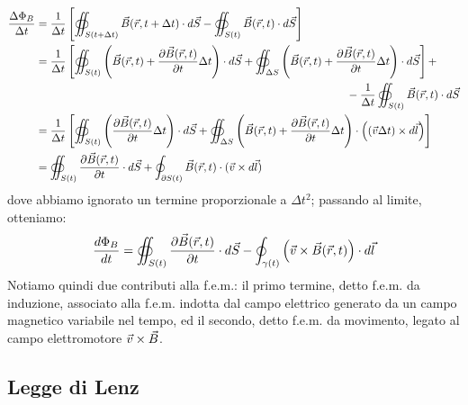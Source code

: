 \begin{equation}
	\begin{split}
		\frac{\Delta\Phi_B}{\Delta t} &= \frac{1}{\Delta t} \left[ \oiint_{S(t+\Delta t)} \vec{B}(\vec{r},t+\Delta t) \cdot d\vec{S} - \oiint_{S(t)} \vec{B}(\vec{r},t)\cdot d\vec{S} \right] \\ 
					      &= \frac{1}{\Delta t} \left[ \oiint_{S(t)} \left( \vec{B}(\vec{r},t) + \frac{\partial\vec{B}(\vec{r},t)}{\partial t} \Delta t \right) \cdot d\vec{S} + \oiint_{\Delta S} \left( \vec{B}(\vec{r},t) + \frac{\partial\vec{B}(\vec{r},t)}{\partial t} \Delta t \right) \cdot d\vec{S} \right] + \\ 
					      & \qquad\qquad\qquad\qquad\qquad\qquad\qquad\qquad\qquad\qquad\qquad\qquad\qquad\qquad -\frac{1}{\Delta t} \oiint_{S(t)} \vec{B}(\vec{r},t)\cdot d\vec{S} \\ 
					      &= \frac{1}{\Delta t} \left[ \oiint_{S(t)} \left( \frac{\partial\vec{B}(\vec{r},t)}{\partial t} \Delta t \right) \cdot d\vec{S} + \oiint_{\Delta S} \left( \vec{B}(\vec{r},t) + \frac{\partial\vec{B}(\vec{r},t)}{\partial t} \Delta t \right) \cdot \left((\vec{v}\Delta t)\times d\vec{l}\right) \right] \\ 
					      &= \oiint_{S(t)} \frac{\partial\vec{B}(\vec{r},t)}{\partial t} \cdot d\vec{S} + \oint_{\partial S(t)} \vec{B}(\vec{r},t)\cdot (\vec{v}\times d\vec{l})
	\end{split}
	\label{eq:14}
\end{equation}
dove abbiamo ignorato un termine proporzionale a $ \Delta t^2 $; passando al limite, otteniamo:
\begin{equation}
	\frac{d\Phi_B}{dt} = \oiint_{S(t)} \frac{\partial\vec{B}(\vec{r},t)}{\partial t} \cdot d\vec{S} - \oint_{\gamma(t)} \left(\vec{v}\times\vec{B}(\vec{r},t)\right)\cdot d\vec{l}
	\label{eq:15}
\end{equation}
Notiamo quindi due contributi alla f.e.m.: il primo termine, detto f.e.m. da induzione, associato alla f.e.m. indotta dal campo elettrico generato da un campo magnetico variabile nel tempo, ed il secondo, detto f.e.m. da movimento, legato al campo elettromotore $ \vec{v}\times\vec{B} $.

\subsection{Legge di Lenz}

